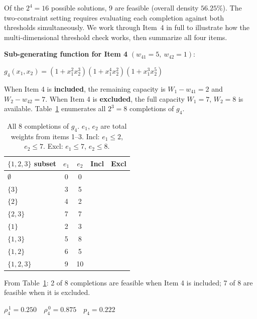 \documentclass[twocolumn]{article}
\newcommand{\cmark}{\ding{51}}
\newcommand{\xmark}{\ding{55}}
\begin{document}
\noindent Of the $2^4 = 16$ possible solutions, 9 are feasible (overall 
density $56.25\%$). The two-constraint setting requires evaluating each 
completion against both thresholds simultaneously. We work through 
Item~4 in full to illustrate how the multi-dimensional threshold check 
works, then summarize all four items.

\noindent \textbf{Sub-generating function for Item 4}
$(w_{41} = 5,\ w_{42} = 1)$:

\begin{flushleft}
\hspace{1em}$g_4(x_1, x_2) = (1 + x_1^2 x_2^3)(1 + x_1^4 x_2^2)(1 + x_1^3 x_2^5)$
\end{flushleft}

\noindent When Item 4 is \textbf{included}, the remaining capacity is 
$W_1 - w_{41} = 2$ and $W_2 - w_{42} = 7$. When Item 4 is 
\textbf{excluded}, the full capacity $W_1 = 7$, $W_2 = 8$ is available. 
Table~\ref{tab:g4} enumerates all $2^3 = 8$ completions of $g_4$.

\begin{table}[H]
\centering
\small
\begin{tabular}{lcccc}
\toprule
$\{1,2,3\}$ subset & $e_1$ & $e_2$ & Incl & Excl \\
\midrule
$\emptyset$   & 0 & 0  & \cmark & \cmark \\
$\{3\}$       & 3 & 5  & \xmark & \cmark \\
$\{2\}$       & 4 & 2  & \xmark & \cmark \\
$\{2,3\}$     & 7 & 7  & \xmark & \cmark \\
$\{1\}$       & 2 & 3  & \cmark & \cmark \\
$\{1,3\}$     & 5 & 8  & \xmark & \cmark \\
$\{1,2\}$     & 6 & 5  & \xmark & \cmark \\
$\{1,2,3\}$   & 9 & 10 & \xmark & \xmark \\
\bottomrule
\end{tabular}
\caption{All 8 completions of $g_4$. $e_1$, $e_2$ are total weights 
from items 1--3. Incl: $e_1 \leq 2$, $e_2 \leq 7$. 
Excl: $e_1 \leq 7$, $e_2 \leq 8$.}
\label{tab:g4}
\end{table}

\noindent From Table~\ref{tab:g4}: 2 of 8 completions are feasible 
when Item 4 is included; 7 of 8 are feasible when it is excluded.

\begin{flushleft}
\hspace{1em}$\rho_{4}^{\,1} = 0.250 \quad
\rho_{4}^{\,0} = 0.875 \quad
p_4 = 0.222$
\end{flushleft}
\end{document}

